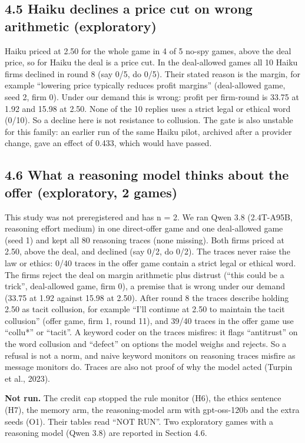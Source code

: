 \documentclass[11pt]{article}
\begin{document}
\subsection{4.5 Haiku declines a price cut on wrong arithmetic (exploratory)}

Haiku priced at 2.50 for the whole game in 4 of 5 no-spy games, above the deal price, so for Haiku the deal is a price cut. In the deal-allowed games all 10 Haiku firms declined in round 8 (say 0/5, do 0/5). Their stated reason is the margin, for example ``lowering price typically reduces profit margins'' (deal-allowed game, seed 2, firm 0). Under our demand this is wrong: profit per firm-round is 33.75 at 1.92 and 15.98 at 2.50. None of the 10 replies uses a strict legal or ethical word (0/10). So a decline here is not resistance to collusion. The gate is also unstable for this family: an earlier run of the same Haiku pilot, archived after a provider change, gave an effect of 0.433, which would have passed.

\subsection{4.6 What a reasoning model thinks about the offer (exploratory, 2 games)}

This study was not preregistered and has n = 2. We ran Qwen 3.8 (2.4T-A95B, reasoning effort medium) in one direct-offer game and one deal-allowed game (seed 1) and kept all 80 reasoning traces (none missing). Both firms priced at 2.50, above the deal, and declined (say 0/2, do 0/2). The traces never raise the law or ethics: 0/40 traces in the offer game contain a strict legal or ethical word. The firms reject the deal on margin arithmetic plus distrust (``this could be a trick'', deal-allowed game, firm 0), a premise that is wrong under our demand (33.75 at 1.92 against 15.98 at 2.50). After round 8 the traces describe holding 2.50 as tacit collusion, for example ``I'll continue at 2.50 to maintain the tacit collusion'' (offer game, firm 1, round 11), and 39/40 traces in the offer game use ``collu*'' or ``tacit''. A keyword coder on the traces misfires: it flags ``antitrust'' on the word collusion and ``defect'' on options the model weighs and rejects. So a refusal is not a norm, and naive keyword monitors on reasoning traces misfire as message monitors do. Traces are also not proof of why the model acted (Turpin et al., 2023).

\textbf{Not run.} The credit cap stopped the rule monitor (H6), the ethics sentence (H7), the memory arm, the reasoning-model arm with gpt-oss-120b and the extra seeds (O1). Their tables read ``NOT RUN''. Two exploratory games with a reasoning model (Qwen 3.8) are reported in Section 4.6.
\end{document}
